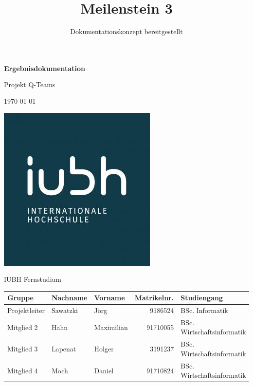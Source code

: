 \documentclass[a4paper,11pt,listof=numbered,glossary=totoc,parskip=half,toc=bib]{scrreprt}
\title{Meilenstein 3}
\subtitle{Dokumentationskonzept bereitgestellt}
\begin{document}
	\begin{titlepage}
		
		\centering
		\vspace*{2.5cm}
		{\large\bfseries \par}	
		{\Huge\bfseries Ergebnisdokumentation\par}
		{\Large\bfseries  \par}

		{\Large Projekt Q-Teams\par}
		{\large\today\par}
		\vspace{0.5cm}

			
		
		\includegraphics[scale=0.5]{iubh_logo}
		
		IUBH Fernstudium
		\vspace{0.5cm}
		
		\begin{tabular}{lllrl}
			\toprule
			\textbf{Gruppe} & \textbf{Nachname} & \textbf{Vorname} & \textbf{Matrikelnr.} & \textbf{Studiengang} \\
			\midrule
			Projektleiter & Sawatzki & Jörg & 9186524 & BSc. Informatik \\
			Mitglied 2 & Hahn & Maximilian & 91710055 & BSc. Wirtschaftsinformatik \\
			Mitglied 3 & Lapenat & Holger & 3191237 & BSc. Wirtschaftsinformatik \\
			Mitglied 4 & Moch & Daniel & 91710824 & BSc. Wirtschaftsinformatik \\
			\bottomrule
		\end{tabular}	
	\end{titlepage}
	
	
	\newpage
	\setcounter{tocdepth}{2}
	\tableofcontents	
	\renewcommand \thechapter{\Roman{chapter}}
	\listoffigures %
	\setcounter{lastRomanCounter}{\value{chapter}} %
	
\end{document}
